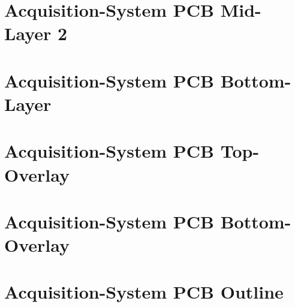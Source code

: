 \section{Acquisition-System PCB Mid-Layer 2}
\enlargethispage{2.5cm}
\begin{adjustwidth}{-0.23cm}{0cm} \hfuzz=7.0pt \vfuzz=19.0pt
\end{adjustwidth}
\newpage

\section{Acquisition-System PCB Bottom-Layer}
\enlargethispage{2.5cm}
\begin{adjustwidth}{0.23cm}{0cm} \hfuzz=7.0pt \vfuzz=19.0pt
\end{adjustwidth}
\newpage

\section{Acquisition-System PCB Top-Overlay}
\enlargethispage{2.5cm}
\begin{adjustwidth}{-0.23cm}{0cm} \hfuzz=7.0pt \vfuzz=19.0pt
\end{adjustwidth}
\newpage

\section{Acquisition-System PCB Bottom-Overlay}
\enlargethispage{2.5cm}
\begin{adjustwidth}{0.23cm}{0cm} \hfuzz=7.0pt \vfuzz=19.0pt
\end{adjustwidth}
\newpage

\section{Acquisition-System PCB Outline}
\enlargethispage{2.5cm}
\begin{adjustwidth}{-0.23cm}{0cm} \hfuzz=7.0pt \vfuzz=19.0pt
\end{adjustwidth}
\newpage

